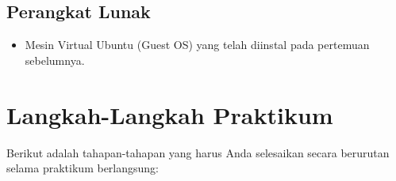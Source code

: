 \subsection{Perangkat Lunak}
\begin{itemize}
	\item Mesin Virtual Ubuntu (Guest OS) yang telah diinstal pada pertemuan sebelumnya.
\end{itemize}

\newpage
\section{Langkah-Langkah Praktikum}

Berikut adalah tahapan-tahapan yang harus Anda selesaikan secara berurutan selama praktikum berlangsung:

